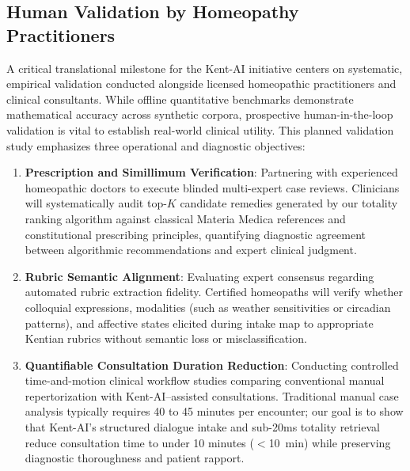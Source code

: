 \subsection{Human Validation by Homeopathy Practitioners}

A critical translational milestone for the Kent-AI initiative centers on systematic, empirical validation conducted alongside licensed homeopathic practitioners and clinical consultants. While offline quantitative benchmarks demonstrate mathematical accuracy across synthetic corpora, prospective human-in-the-loop validation is vital to establish real-world clinical utility. This planned validation study emphasizes three operational and diagnostic objectives:

\begin{enumerate}
  \item \textbf{Prescription and Simillimum Verification}: Partnering with experienced homeopathic doctors to execute blinded multi-expert case reviews. Clinicians will systematically audit top-$K$ candidate remedies generated by our totality ranking algorithm against classical Materia Medica references and constitutional prescribing principles, quantifying diagnostic agreement between algorithmic recommendations and expert clinical judgment.
  \item \textbf{Rubric Semantic Alignment}: Evaluating expert consensus regarding automated rubric extraction fidelity. Certified homeopaths will verify whether colloquial expressions, modalities (such as weather sensitivities or circadian patterns), and affective states elicited during intake map to appropriate Kentian rubrics without semantic loss or misclassification.
  \item \textbf{Quantifiable Consultation Duration Reduction}: Conducting controlled time-and-motion clinical workflow studies comparing conventional manual repertorization with Kent-AI--assisted consultations. Traditional manual case analysis typically requires 40 to 45 minutes per encounter; our goal is to show that Kent-AI's structured dialogue intake and sub-20ms totality retrieval reduce consultation time to under 10 minutes ($<$10~min) while preserving diagnostic thoroughness and patient rapport.
\end{enumerate}

